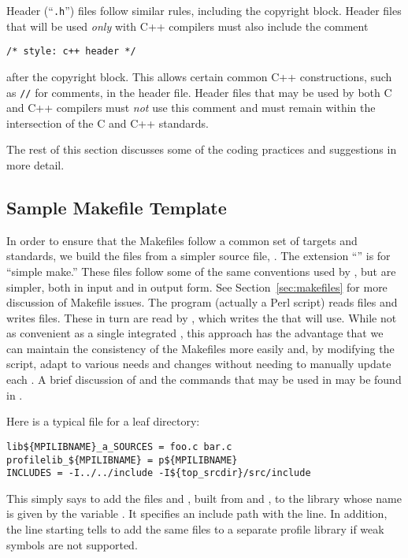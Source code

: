 \documentclass{article}
\begin{document}
Header (``\texttt{.h}'') files follow similar rules, including the copyright
block.  Header files that will be used \emph{only} with C++ compilers must
also include the comment
\begin{verbatim}
/* style: c++ header */
\end{verbatim}
after the copyright block.  This allows certain common C++ constructions, such
as \texttt{//} for comments, in the header file.  Header files that may be
used by both C and C++ compilers must \emph{not} use this comment and
must remain within the intersection of the C and C++ standards.

The rest of this section discusses some of the coding practices and
suggestions in more detail.

\subsection{Sample Makefile Template}
\label{sec:makefile-template}

In order to ensure that the Makefiles follow a common set of targets and
standards, we build the  files from a simpler source file,
.  The extension ``'' is for ``simple make.''  These files
follow some of the same conventions used by , but are
simpler, both in input and in output form.
See Section~\ref{sec:makefiles} for more discussion of Makefile issues.
The program (actually a Perl script)  reads
 files and writes  files.  These in turn
are read by , which writes the  that
 will use.  While not as convenient as a single integrated
, this approach has the advantage that we can maintain the
consistency of the Makefiles more easily and, by modifying the
 script, adapt to various needs and changes without
needing to 
manually update each .  A brief discussion of
 and the commands that may be used in
 may be found in . 

Here is a typical  file for a leaf directory:
\begin{verbatim}
lib${MPILIBNAME}_a_SOURCES = foo.c bar.c
profilelib_${MPILIBNAME} = p${MPILIBNAME}
INCLUDES = -I../../include -I${top_srcdir}/src/include
\end{verbatim}
This simply says to add the files  and , built
from  and , to the library whose name is given
by the  variable .  It specifies an
include path with the  line.  In addition, the line
starting  tells  to add the same
files to a separate profile library if weak symbols are not supported.
\end{document}

